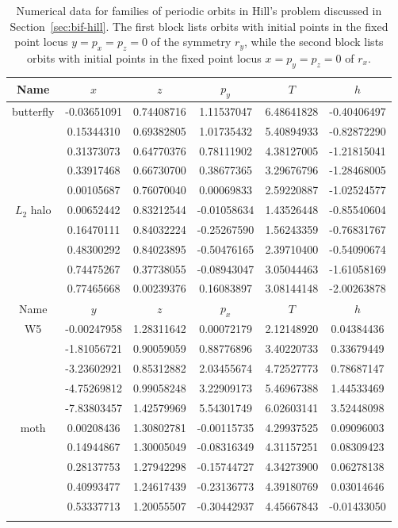 \documentclass[pdflatex,sn-mathphys-ay]{sn-jnl}%
\theoremstyle{thmstyleone}%
\theoremstyle{thmstyletwo}%
\theoremstyle{thmstylethree}%
\begin{document}
\begin{table}[!h]
\centering
\caption{
Numerical data for families of periodic orbits in Hill's problem discussed in Section~\ref{sec:bif-hill}.
The first block lists orbits with initial points in the fixed point locus $y = p_x = p_z = 0$ of the symmetry $r_y$, while the second block lists orbits with initial points in the fixed point locus $x = p_y = p_z = 0$ of $r_x$.
}
\scriptsize
\label{tbl:data-hill}
\begin{tabular}{cccccc}
\toprule
Name & $x$ & $z$ & $p_y$ & $T$ & $h$ \\ 
\midrule
\midrule
butterfly & -0.03651091 & 0.74408716 & 1.11537047 & 6.48641828 & -0.40406497 \\
 & 0.15344310 & 0.69382805 & 1.01735432 & 5.40894933 & -0.82872290 \\
 & 0.31373073 & 0.64770376 & 0.78111902 & 4.38127005 & -1.21815041 \\
 & 0.33917468 & 0.66730700 & 0.38677365 & 3.29676796 & -1.28468005 \\
 & 0.00105687 & 0.76070040 & 0.00069833 & 2.59220887 & -1.02524577 \\
\midrule
$L_2$ halo & 0.00652442 & 0.83212544 & -0.01058634 & 1.43526448 & -0.85540604 \\
 & 0.16470111 & 0.84032224 & -0.25267590 & 1.56243359 & -0.76831767 \\
 & 0.48300292 & 0.84023895 & -0.50476165 & 2.39710400 & -0.54090674 \\
 & 0.74475267 & 0.37738055 & -0.08943047 & 3.05044463 & -1.61058169 \\
 & 0.77465668 & 0.00239376 & 0.16083897 & 3.08144148 & -2.00263878 \\
\botrule 
\toprule
Name & $y$ & $z$ & $p_x$ & $T$ & $h$ \\ 
\midrule
\midrule
W5 & -0.00247958 & 1.28311642 & 0.00072179 & 2.12148920 & 0.04384436 \\
 & -1.81056721 & 0.90059059 & 0.88776896 & 3.40220733 & 0.33679449 \\
 & -3.23602921 & 0.85312882 & 2.03455674 & 4.72527773 & 0.78687147 \\
 & -4.75269812 & 0.99058248 & 3.22909173 & 5.46967388 & 1.44533469 \\
 & -7.83803457 & 1.42579969 & 5.54301749 & 6.02603141 & 3.52448098 \\
\midrule
moth & 0.00208436 & 1.30802781 & -0.00115735 & 4.29937525 & 0.09096003 \\
 & 0.14944867 & 1.30005049 & -0.08316349 & 4.31157251 & 0.08309423 \\
 & 0.28137753 & 1.27942298 & -0.15744727 & 4.34273900 & 0.06278138 \\
 & 0.40993477 & 1.24617439 & -0.23136773 & 4.39180769 & 0.03014646 \\
 & 0.53337713 & 1.20055507 & -0.30442937 & 4.45667843 & -0.01433050 \\
\botrule
\end{tabular}
\end{table}
\end{document}
